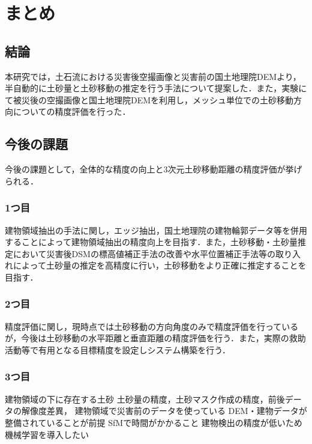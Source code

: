 \chapter{まとめ}
  \section{結論}
    本研究では，土石流における災害後空撮画像と災害前の国土地理院DEMより，半自動的に土砂量と土砂移動の推定を行う手法について提案した．また，実験にて被災後の空撮画像と国土地理院DEMを利用し，メッシュ単位での土砂移動方向についての精度評価を行った．


  \section{今後の課題}
    今後の課題として，全体的な精度の向上と3次元土砂移動距離の精度評価が挙げられる．

    \subsection{1つ目}
      建物領域抽出の手法に関し，エッジ抽出，国土地理院の建物輪郭データ等を併用することによって建物領域抽出の精度向上を目指す．また，土砂移動・土砂量推定において災害後DSMの標高値補正手法の改善や水平位置補正手法\cite{土砂量解析1}等の取り入れによって土砂量の推定を高精度に行い，土砂移動をより正確に推定することを目指す．

    \subsection{2つ目}
      精度評価に関し，現時点では土砂移動の方向角度のみで精度評価を行っているが，今後は土砂移動の水平距離と垂直距離の精度評価を行う．また，実際の救助活動等で有用となる目標精度を設定しシステム構築を行う．

    \subsection{3つ目}
      建物領域の下に存在する土砂
      土砂量の精度，土砂マスク作成の精度，前後データの解像度差異，
      建物領域で災害前のデータを使っている
      DEM・建物データが整備されていることが前提
      SfMで時間がかかること
      建物検出の精度が低いため機械学習を導入したい
